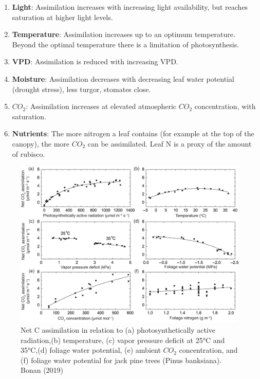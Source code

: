 \documentclass[
  12pt,
  oneside]{book}
\providecommand{\tightlist}{%
  \setlength{\itemsep}{0pt}\setlength{\parskip}{0pt}}
\begin{document}
\begin{enumerate}
\def\labelenumi{\arabic{enumi}.}
\tightlist
\item
  \textbf{Light}: Assimilation increases with increasing light availability, but reaches saturation at higher light levels.
\item
  \textbf{Temperature}: Assimilation increases up to an optimum temperature. Beyond the optimal temperature there is a limitation of photosynthesis.
\item
  \textbf{VPD}: Assimilation is reduced with increasing VPD.
\item
  \textbf{Moisture}: Assimilation decreases with decreasing leaf water potential (drought stress), less turgor, stomates close.
\item
  \textbf{\(CO_2\)}: Assimilation increases at elevated atmospheric \(CO_2\) concentration, with saturation.
\item
  \textbf{Nutrients}: The more nitrogen a leaf contains (for example at the top of the canopy), the more \(CO_2\) can be assimilated. Leaf N is a proxy of the amount of rubisco.
\end{enumerate}

\begin{figure}

{\centering \includegraphics[width=0.8\linewidth]{figures/chap2/photosynthesis_obs} 

}

\caption{Net C assimilation in relation to (a) photosynthetically active radiation,(b) temperature, (c) vapor pressure deficit at 25°C and 35°C,(d) foliage water potential, (e) ambient $CO_2$ concentration, and (f) foliage water potential for jack pine trees (Pinus banksiana). Bonan (2019)}\label{fig:f22}
\end{figure}
\end{document}
